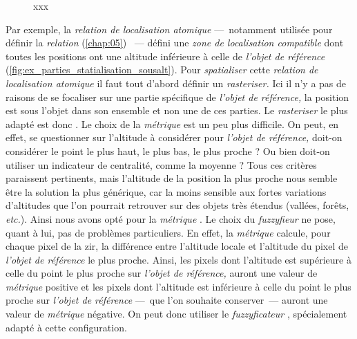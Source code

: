 \begin{figure}
  \centering
  
  \caption{xxx}
  \label{fig:structure_spatialisation_ontologie}
\end{figure}

Par exemple, la \emph{relation de localisation atomique}
 ---~notamment utilisée pour définir
la \emph{relation}  (\autoref{chap:05})
~--- défini une \emph{zone de localisation compatible} dont
toutes les positions ont une altitude inférieure à celle de
\emph{l'objet de référence}
(\autoref{fig:ex_parties_statialisation_sousalt}). Pour
\emph{spatialiser} cette \emph{relation de localisation atomique} il
faut tout d'abord définir un \emph{rasteriser.} Ici il n'y a pas de
raisons de se focaliser sur une partie spécifique de \emph{l'objet de
  référence,} la position est sous l'objet dans son ensemble et non
une de ces parties. Le \emph{rasteriser} le plus adapté est donc
. Le choix de la \emph{métrique} est un peu plus
difficile. On peut, en effet, se questionner sur l'altitude à
considérer pour \emph{l'objet de référence,} doit-on considérer le
point le plus haut, le plus bas, le plus proche ? Ou bien doit-on
utiliser un indicateur de centralité, comme la moyenne ? Tous ces
critères paraissent pertinents, mais l'altitude de la position la plus
proche nous semble être la solution la plus générique, car la moins
sensible aux fortes variations d'altitudes que l'on pourrait retrouver
sur des objets très étendus (\eg vallées, forêts, \emph{etc.}). Ainsi
nous avons opté pour la \emph{métrique}
. Le choix du \emph{fuzzyfieur} ne
pose, quant à lui, pas de problèmes particuliers. En effet, la
\emph{métrique}  calcule, pour chaque
pixel de la \ac{zir}, la différence entre l'altitude locale et
l'altitude du pixel de \emph{l'objet de référence} le plus
proche. Ainsi, les pixels dont l'altitude est supérieure à celle du
point le plus proche sur \emph{l'objet de référence,} auront une
valeur de \emph{métrique} positive et les pixels dont l'altitude est
inférieure à celle du point le plus proche sur \emph{l'objet de
  référence} ---~que l'on souhaite conserver~--- auront une valeur de
\emph{métrique} négative. On peut donc utiliser le
\emph{fuzzyficateur} , spécialement adapté à
cette configuration.

